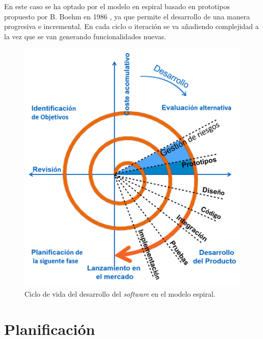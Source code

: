 En este caso se ha optado por el modelo en espiral basado en prototipos propuesto por B. Boehm en 1986 \parencite{Reference7}, ya que permite el desarrollo de una manera progresiva e incremental. En cada ciclo o iteración se va añadiendo complejidad a la vez que se van generando funcionalidades nuevas.

\begin{figure}[th]
\centering
\includegraphics[scale=0.6]{Figures/spiral.png}
\decoRule
\caption[Spiral]{Ciclo de vida del desarrollo del \textit{software} en el modelo espiral.}
\label{fig:spiral}
\end{figure}

\section{Planificación}


